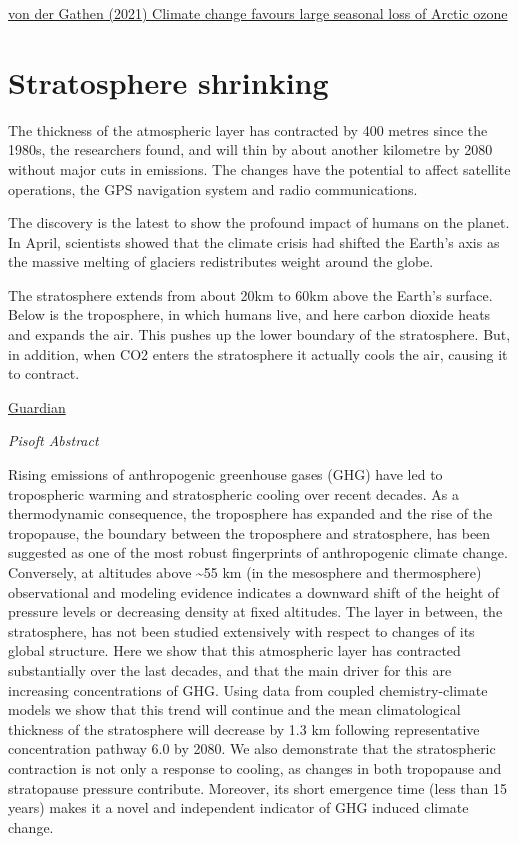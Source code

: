 \documentclass[
]{book}
\begin{document}
\href{https://www.nature.com/articles/s41467-021-24089-6}{von der Gathen (2021) Climate change favours large seasonal loss of Arctic ozone}

\hypertarget{stratosphere-shrinking}{%
\section{Stratosphere shrinking}\label{stratosphere-shrinking}}

The thickness of the atmospheric layer has contracted by 400 metres since the 1980s, the researchers found, and will thin by about another kilometre by 2080 without major cuts in emissions. The changes have the potential to affect satellite operations, the GPS navigation system and radio communications.

The discovery is the latest to show the profound impact of humans on the planet. In April, scientists showed that the climate crisis had shifted the Earth's axis as the massive melting of glaciers redistributes weight around the globe.

The stratosphere extends from about 20km to 60km above the Earth's surface. Below is the troposphere, in which humans live, and here carbon dioxide heats and expands the air. This pushes up the lower boundary of the stratosphere. But, in addition, when CO2 enters the stratosphere it actually cools the air, causing it to contract.

\href{https://www.theguardian.com/environment/2021/may/12/emissions-shrinking-the-stratosphere-scientists-find}{Guardian}

\emph{Pisoft Abstract}

Rising emissions of anthropogenic greenhouse gases (GHG) have led to tropospheric warming and stratospheric cooling over recent decades. As a thermodynamic consequence, the troposphere has expanded and the rise of the tropopause, the boundary between the troposphere and stratosphere, has been suggested as one of the most robust fingerprints of anthropogenic climate change. Conversely, at altitudes above \textasciitilde55 km (in the mesosphere and thermosphere) observational and modeling evidence indicates a downward shift of the height of pressure levels or decreasing density at fixed altitudes. The layer in between, the stratosphere, has not been studied extensively with respect to changes of its global structure. Here we show that this atmospheric layer has contracted substantially over the last decades, and that the main driver for this are increasing concentrations of GHG. Using data from coupled chemistry-climate models we show that this trend will continue and the mean climatological thickness of the stratosphere will decrease by 1.3 km following representative concentration pathway 6.0 by 2080. We also demonstrate that the stratospheric contraction is not only a response to cooling, as changes in both tropopause and stratopause pressure contribute. Moreover, its short emergence time (less than 15 years) makes it a novel and independent indicator of GHG induced climate change.
\end{document}
